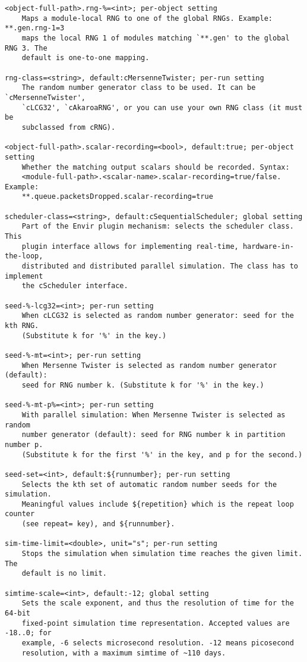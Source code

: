\begin{verbatim}
<object-full-path>.rng-%=<int>; per-object setting
    Maps a module-local RNG to one of the global RNGs. Example: **.gen.rng-1=3
    maps the local RNG 1 of modules matching `**.gen' to the global RNG 3. The
    default is one-to-one mapping.

rng-class=<string>, default:cMersenneTwister; per-run setting
    The random number generator class to be used. It can be `cMersenneTwister',
    `cLCG32', `cAkaroaRNG', or you can use your own RNG class (it must be
    subclassed from cRNG).

<object-full-path>.scalar-recording=<bool>, default:true; per-object setting
    Whether the matching output scalars should be recorded. Syntax:
    <module-full-path>.<scalar-name>.scalar-recording=true/false. Example:
    **.queue.packetsDropped.scalar-recording=true

scheduler-class=<string>, default:cSequentialScheduler; global setting
    Part of the Envir plugin mechanism: selects the scheduler class. This
    plugin interface allows for implementing real-time, hardware-in-the-loop,
    distributed and distributed parallel simulation. The class has to implement
    the cScheduler interface.

seed-%-lcg32=<int>; per-run setting
    When cLCG32 is selected as random number generator: seed for the kth RNG.
    (Substitute k for '%' in the key.)

seed-%-mt=<int>; per-run setting
    When Mersenne Twister is selected as random number generator (default):
    seed for RNG number k. (Substitute k for '%' in the key.)

seed-%-mt-p%=<int>; per-run setting
    With parallel simulation: When Mersenne Twister is selected as random
    number generator (default): seed for RNG number k in partition number p.
    (Substitute k for the first '%' in the key, and p for the second.)

seed-set=<int>, default:${runnumber}; per-run setting
    Selects the kth set of automatic random number seeds for the simulation.
    Meaningful values include ${repetition} which is the repeat loop counter
    (see repeat= key), and ${runnumber}.

sim-time-limit=<double>, unit="s"; per-run setting
    Stops the simulation when simulation time reaches the given limit. The
    default is no limit.

simtime-scale=<int>, default:-12; global setting
    Sets the scale exponent, and thus the resolution of time for the 64-bit
    fixed-point simulation time representation. Accepted values are -18..0; for
    example, -6 selects microsecond resolution. -12 means picosecond
    resolution, with a maximum simtime of ~110 days.


\end{verbatim}
